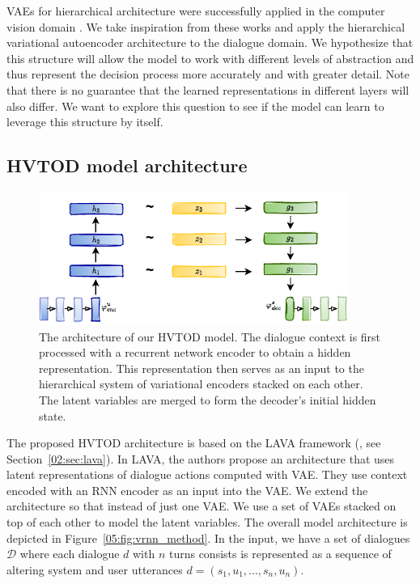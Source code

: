 VAEs for hierarchical architecture were successfully applied in the computer vision domain \cite{vahdat2020nvae,li2020progressive}.
We take inspiration from these works and apply the hierarchical variational autoencoder architecture to the dialogue domain.
We hypothesize that this structure will allow the model to work with different levels of abstraction and thus represent the decision process more accurately and with greater detail.
Note that there is no guarantee that the learned representations in different layers will also differ.
We want to explore this question to see if the model can learn to leverage this structure by itself. 

\subsection{HVTOD model architecture}
\begin{figure}[h]
    \centering
    \includegraphics[width=0.9\textwidth]{images/HVTOD-full-noN.pdf}
    \caption{The architecture of our HVTOD model. The dialogue context is first processed with a recurrent network encoder to obtain a hidden representation. This representation then serves as an input to the hierarchical system of variational encoders stacked on each other. The latent variables are merged to form the decoder's initial hidden state.}
    \label{05:fig:HVTOD-full}
\end{figure}
The proposed HVTOD architecture is based on the LAVA framework (\citealp{lubis-etal-2022-dialogue}, see Section~\ref{02:sec:lava}).
In LAVA, the authors propose an architecture that uses latent representations of dialogue actions computed with VAE.
They use context encoded with an RNN encoder as an input into the VAE.
We extend the architecture so that instead of just one VAE.
We use a set of VAEs stacked on top of each other to model the latent variables.
The overall model architecture is depicted in Figure~\ref{05:fig:vrnn_method}.
In the input, we have a set of dialogues $\mathcal{D}$ where each dialogue $d$ with $n$ turns consists is represented as a sequence of altering system and user utterances $d = (s_1,u_1,...,s_n,u_n)$.
